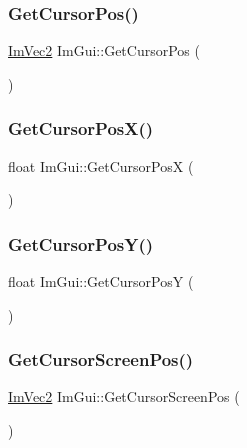 \mbox{\label{namespaceImGui_a2fa4eb57e0f73b90e8edcd226a0cc7d5}} 
\subsubsection{\texorpdfstring{Get\+Cursor\+Pos()}{GetCursorPos()}}
{\footnotesize\ttfamily \hyperlink{structImVec2}{Im\+Vec2} Im\+Gui\+::\+Get\+Cursor\+Pos (\begin{DoxyParamCaption}{ }\end{DoxyParamCaption})}

\mbox{\label{namespaceImGui_a022e32c808ac899e25847f4d65633b77}} 
\subsubsection{\texorpdfstring{Get\+Cursor\+Pos\+X()}{GetCursorPosX()}}
{\footnotesize\ttfamily float Im\+Gui\+::\+Get\+Cursor\+PosX (\begin{DoxyParamCaption}{ }\end{DoxyParamCaption})}

\mbox{\label{namespaceImGui_a86e409551f256b542166989c558d41c1}} 
\subsubsection{\texorpdfstring{Get\+Cursor\+Pos\+Y()}{GetCursorPosY()}}
{\footnotesize\ttfamily float Im\+Gui\+::\+Get\+Cursor\+PosY (\begin{DoxyParamCaption}{ }\end{DoxyParamCaption})}

\mbox{\label{namespaceImGui_adb0db3c1ee36f5085f35890a4229ae75}} 
\subsubsection{\texorpdfstring{Get\+Cursor\+Screen\+Pos()}{GetCursorScreenPos()}}
{\footnotesize\ttfamily \hyperlink{structImVec2}{Im\+Vec2} Im\+Gui\+::\+Get\+Cursor\+Screen\+Pos (\begin{DoxyParamCaption}{ }\end{DoxyParamCaption})}

